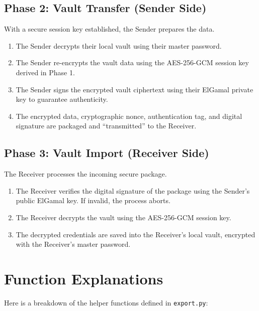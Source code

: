 \documentclass{article}
\begin{document}
\subsection{Phase 2: Vault Transfer (Sender Side)}
With a secure session key established, the Sender prepares the data.
\begin{enumerate}
    \item The Sender decrypts their local vault using their master password.
    \item The Sender re-encrypts the vault data using the AES-256-GCM session key derived in Phase 1.
    \item The Sender signs the encrypted vault ciphertext using their ElGamal private key to guarantee authenticity.
    \item The encrypted data, cryptographic nonce, authentication tag, and digital signature are packaged and ``transmitted'' to the Receiver.
\end{enumerate}

\subsection{Phase 3: Vault Import (Receiver Side)}
The Receiver processes the incoming secure package.
\begin{enumerate}
    \item The Receiver verifies the digital signature of the package using the Sender's public ElGamal key. If invalid, the process aborts.
    \item The Receiver decrypts the vault using the AES-256-GCM session key.
    \item The decrypted credentials are saved into the Receiver's local vault, encrypted with the Receiver's master password.
\end{enumerate}

\section{Function Explanations}

Here is a breakdown of the helper functions defined in \texttt{export.py}:
\end{document}
